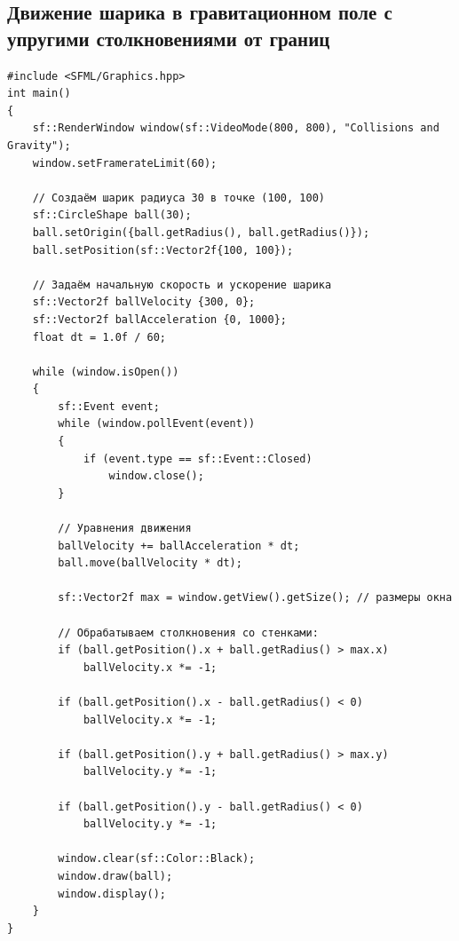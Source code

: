 \documentclass{article}
\begin{document}
\subsection*{Движение шарика в гравитационном поле с упругими столкновениями от границ}
\begin{lstlisting}
#include <SFML/Graphics.hpp>
int main()
{
    sf::RenderWindow window(sf::VideoMode(800, 800), "Collisions and Gravity");
    window.setFramerateLimit(60);
 
 	// Создаём шарик радиуса 30 в точке (100, 100)
    sf::CircleShape ball(30);
    ball.setOrigin({ball.getRadius(), ball.getRadius()});
    ball.setPosition(sf::Vector2f{100, 100});

	// Задаём начальную скорость и ускорение шарика
    sf::Vector2f ballVelocity {300, 0};
    sf::Vector2f ballAcceleration {0, 1000};
    float dt = 1.0f / 60;

    while (window.isOpen())
    {
        sf::Event event;
        while (window.pollEvent(event)) 
        {
            if (event.type == sf::Event::Closed)
                window.close();
        }
        
        // Уравнения движения
        ballVelocity += ballAcceleration * dt;
        ball.move(ballVelocity * dt);
		
        sf::Vector2f max = window.getView().getSize(); // размеры окна
        
        // Обрабатываем столкновения со стенками:
        if (ball.getPosition().x + ball.getRadius() > max.x)
            ballVelocity.x *= -1;
            
        if (ball.getPosition().x - ball.getRadius() < 0)
            ballVelocity.x *= -1;
            
        if (ball.getPosition().y + ball.getRadius() > max.y)
            ballVelocity.y *= -1;
            
        if (ball.getPosition().y - ball.getRadius() < 0)
            ballVelocity.y *= -1;

        window.clear(sf::Color::Black);
        window.draw(ball);
        window.display();
    }
}
\end{lstlisting}
\end{document}
